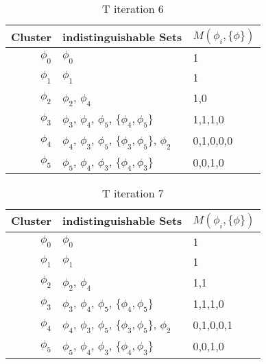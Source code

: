 \documentclass{article}
\begin{document}
				\begin{table}[h!]
				  \begin{center}
				    \caption{T iteration 6}
				    \label{tab:table8}
				    \begin{tabular}{r|l|l}
				      Cluster & indistinguishable Sets & $M(\phi_i, \{\phi\})$\\
				      \hline
				      $\phi_0$ & $\phi_0$ & 1\\
				      $\phi_1$ & $\phi_1$ & 1\\
				      $\phi_2$ & $\phi_2$, $\phi_4$ & 1,0\\
				      $\phi_3$ & $\phi_3$, $\phi_4$, $\phi_5$, $\{\phi_4,\phi_5\}$ & 1,1,1,0\\
				      $\phi_4$ & $\phi_4$, $\phi_3$, $\phi_5$, $\{\phi_3,\phi_5\}$, $\phi_2$ & 0,1,0,0,0\\
				      $\phi_5$ & $\phi_5$, $\phi_4$, $\phi_3$, $\{\phi_4,\phi_3\}$ & 0,0,1,0\\
				    \end{tabular}
				  \end{center}
				\end{table}

				\begin{table}[h!]
				  \begin{center}
				    \caption{T iteration 7}
				    \label{tab:table9}
				    \begin{tabular}{r|l|l}
				      Cluster & indistinguishable Sets & $M(\phi_i, \{\phi\})$\\
				      \hline
				      $\phi_0$ & $\phi_0$ & 1\\
				      $\phi_1$ & $\phi_1$ & 1\\
				      $\phi_2$ & $\phi_2$, $\phi_4$ & 1,1\\
				      $\phi_3$ & $\phi_3$, $\phi_4$, $\phi_5$, $\{\phi_4,\phi_5\}$ & 1,1,1,0\\
				      $\phi_4$ & $\phi_4$, $\phi_3$, $\phi_5$, $\{\phi_3,\phi_5\}$, $\phi_2$ & 0,1,0,0,1\\
				      $\phi_5$ & $\phi_5$, $\phi_4$, $\phi_3$, $\{\phi_4,\phi_3\}$ & 0,0,1,0\\
				    \end{tabular}
				  \end{center}
				\end{table}
\end{document}
